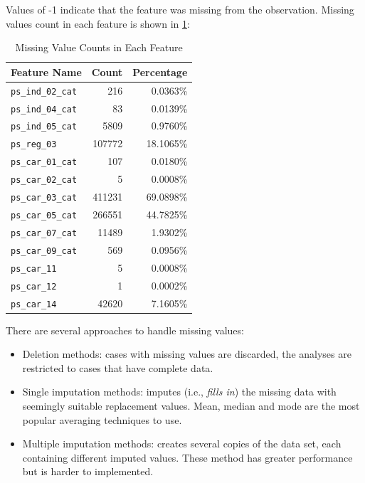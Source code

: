 \documentclass{standalone}
\begin{document}
Values of -1 indicate that the feature was missing from
the observation. Missing values count in each feature is shown in \cref{missing_count}:

\begin{table}[!h]
\renewcommand{\arraystretch}{1.3}
\caption{Missing Value Counts in Each Feature}\label{missing_count}
\centering
\begin{tabular}{l|r|r}
\toprule
\bfseries Feature Name & \bfseries Count & \bfseries Percentage \\
\midrule
\verb|ps_ind_02_cat|  &      216 & 0.0363\%\\
\verb|ps_ind_04_cat|  &       83 & 0.0139\%\\
\verb|ps_ind_05_cat|  &     5809 & 0.9760\%\\
\verb|ps_reg_03|      &   107772 & 18.1065\%\\
\verb|ps_car_01_cat|  &      107 & 0.0180\%\\
\verb|ps_car_02_cat|  &        5 & 0.0008\%\\
\verb|ps_car_03_cat|  &   411231 & 69.0898\%\\
\verb|ps_car_05_cat|  &   266551 & 44.7825\%\\
\verb|ps_car_07_cat|  &    11489 & 1.9302\%\\
\verb|ps_car_09_cat|  &      569 & 0.0956\%\\
\verb|ps_car_11|      &        5 & 0.0008\%\\
\verb|ps_car_12|      &        1 & 0.0002\%\\
\verb|ps_car_14|      &    42620 & 7.1605\%\\
\bottomrule
\end{tabular}
\end{table}

There are several approaches to handle missing values\cite{Intro:Missing}:

\begin{itemize}
\item Deletion methods: cases with missing values are discarded, the analyses are restricted to cases that have
complete data.
\item Single imputation methods: imputes (i.e., \emph{fills in}) the missing data with seemingly suitable replacement values. Mean, median and mode are the most popular averaging techniques to use\cite{Missing:Howto}.
\item Multiple imputation methods: creates several copies of the data set, each containing different
imputed values. These method has greater performance but is harder to implemented.
\end{itemize}
\end{document}
